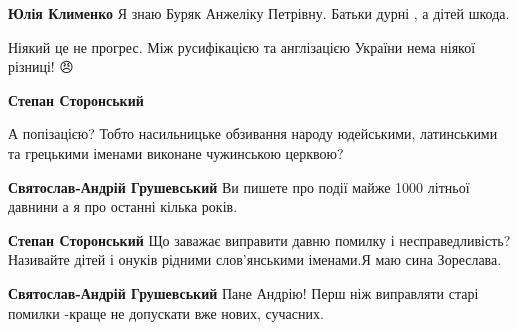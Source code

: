 \begin{itemize}
\begin{itemize}
\textbf{Юлія Клименко} Я знаю Буряк Анжеліку Петрівну. Батьки дурні , а дітей шкода.
\end{itemize}

 

Ніякий це не прогрес. Між русифікацією та англізацією України нема ніякої
різниці! 😠

\begin{itemize}
 
\textbf{Степан Сторонський} 

А попізацією? Тобто насильницьке обзивання народу юдейськими, латинськими та грецькими іменами виконане чужинською церквою?

 
\textbf{Святослав-Андрій Грушевський} Ви пишете про події майже 1000 літньої давнини а я про останні кілька років.

 
\textbf{Степан Сторонський} Що заважає виправити давню помилку і несправедливість?Називайте дітей і онуків рідними слов'янськими іменами.Я маю сина Зореслава.

 
\textbf{Святослав-Андрій Грушевський} Пане Андрію! Перш ніж виправляти старі помилки -краще не допускати вже нових, сучасних.


\end{itemize}
\end{itemize}
